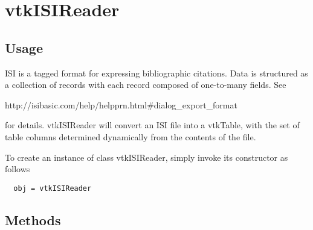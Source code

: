 \section{vtkISIReader}

\subsection{Usage}

 ISI is a tagged format for expressing bibliographic citations.  Data is
 structured as a collection of records with each record composed of
 one-to-many fields.  See

 http://isibasic.com/help/helpprn.html\#dialog\_export\_format

 for details.  vtkISIReader will convert an ISI file into a vtkTable, with
 the set of table columns determined dynamically from the contents of the
 file.

To create an instance of class vtkISIReader, simply
invoke its constructor as follows
\begin{verbatim}
  obj = vtkISIReader
\end{verbatim}
\subsection{Methods}

